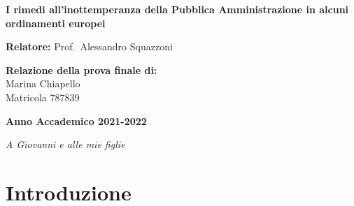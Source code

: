 \documentclass[12pt,it,a4paper,]{report}
\begin{document}
\begin{titlepage}
        \vspace{10mm}
        
      	\begin{center}
            {\LARGE{
                    \textbf{I rimedi all'inottemperanza della Pubblica
Amministrazione in alcuni ordinamenti europei}
                    \par
            }}
        \end{center}

        
        \vspace{8mm}

        \noindent
        {\large \textbf{Relatore:}  Prof.~Alessandro Squazzoni } \\

        \vspace{5mm}

        \begin{flushright}
            {\large \textbf{Relazione della prova finale di:}} \\
            \large{Marina Chiapello} \\
            \large{Matricola 787839} 
        \end{flushright}
        
        \vspace{5mm}
        \begin{center}
            {\large{\bf Anno Accademico 2021-2022}}
        \end{center}

        \restoregeometry
        
    \end{titlepage}




\vspace*{\fill}

\noindent \hfill{
\textit{
A Giovanni e alle mie figlie
}} \vspace*{\fill}  \newpage

\setcounter{page}{1}

\hypertarget{introduzione}{%
\chapter*{Introduzione}\label{introduzione}}
\end{document}
